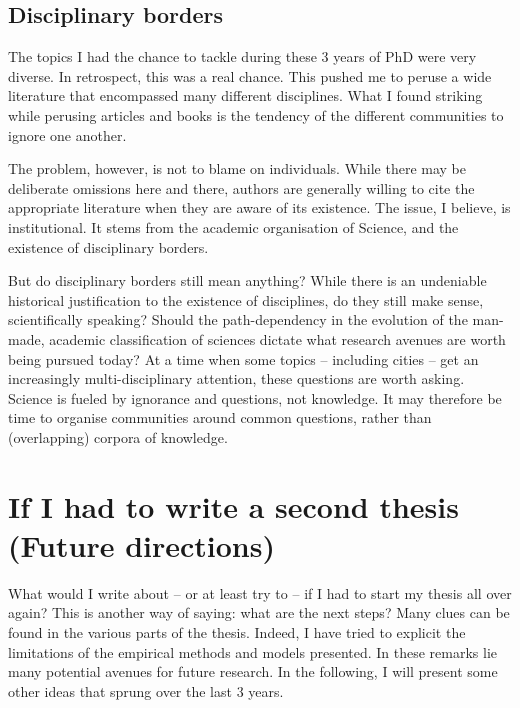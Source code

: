 \subsection{Disciplinary borders}
\label{sub:disciplinary_borders}


The topics I had the chance to tackle during these 3 years of PhD were very
diverse. In retrospect, this was a real chance. This pushed me to peruse a wide
literature that encompassed many different disciplines. What I found striking
while perusing articles and books is the tendency of the different communities to
ignore one another. 

The problem, however, is not to blame on individuals. While there may be
deliberate omissions here and there, authors are generally willing to cite the
appropriate literature when they are aware of its existence. The issue, I
believe, is institutional. It stems from the academic organisation of Science,
and the existence of disciplinary borders.

But do disciplinary borders still mean anything? While there is an undeniable
historical justification to the existence of disciplines, do they still make
sense, scientifically speaking? Should the path-dependency in the evolution of
the man-made, academic classification of sciences dictate what research avenues
are worth being pursued today? At a time when some topics -- including cities
-- get an increasingly multi-disciplinary attention, these questions are worth
asking. Science is fueled by ignorance and questions, not knowledge. It may therefore be
time to organise communities around common questions, rather than (overlapping)
corpora of knowledge.


\section{If I had to write a second thesis (Future directions)}
\label{sec:limitations}

What would I write about -- or at least try to -- if I had to start my
thesis all over again? This is another way of saying: what are the next steps?
Many clues can be found in the various parts of the thesis. Indeed, I have tried
to explicit the limitations of the empirical methods and models presented. In
these remarks lie many potential avenues for future research. In the following,
I will present some other ideas that sprung over the last $3$ years.\\

